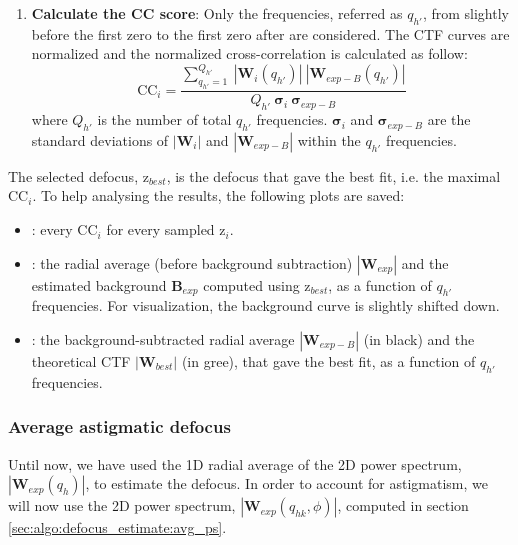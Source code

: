 \begin{enumerate}
    \item \textbf{Calculate the CC score}: Only the frequencies, referred as $q_{h'}$, from slightly before the first zero to the first zero after  are considered. The CTF curves are normalized and the normalized cross-correlation is calculated as follow:
    \begin{equation}
        \bm{\mathrm{CC}}_{i} = \frac{
            \sum_{q_{h'}=1}^{Q_{h'}}\ {|\bm{W}_i(q_{h'})|}\ |\bm{W}_{exp-B}(q_{h'})|
            }{ Q_{h'}\ \bm{\sigma}_{i}\ \bm{\sigma}_{exp-B} }
    \end{equation}
    where $Q_{h'}$ is the number of total $q_{h'}$ frequencies. $\bm{\sigma}_{i}$ and $\bm{\sigma}_{exp-B}$ are the standard deviations of $|\bm{W}_{i}|$ and $|\bm{W}_{exp-B}|$ within the $q_{h'}$ frequencies.
\end{enumerate}

The selected defocus, $\bm{\mathrm{z}}_{best}$, is the defocus that gave the best fit, i.e. the maximal $\bm{\mathrm{CC}}_{i}$. To help analysing the results, the following plots are saved:
\begin{itemize}
    \item {}: every $\bm{\mathrm{CC}}_i$ for every sampled $\bm{\mathrm{z}}_i$.
    \item {}: the radial average (before background subtraction) $|\bm{W}_{exp}|$ and the estimated background $\bm{B}_{exp}$ computed using $\bm{\mathrm{z}}_{best}$, as a function of $q_{h'}$ frequencies. For visualization, the background curve is slightly shifted down.
    \item {}: the background-subtracted radial average $|\bm{W}_{exp-B}|$ (in black) and the theoretical CTF $|\bm{W}_{best}|$ (in gree), that gave the best fit, as a function of $q_{h'}$ frequencies.
\end{itemize} \label{subsubsec:avf_def}

\subsubsection{Average astigmatic defocus}

Until now, we have used the 1D radial average of the 2D power spectrum, $|\bm{W}_{exp}(q_h)|$,  to estimate the defocus. In order to account for astigmatism, we will now use the 2D power spectrum, $|\bm{W}_{exp}(q_{hk}, \phi)|$, computed in section \ref{sec:algo:defocus_estimate:avg_ps}.

